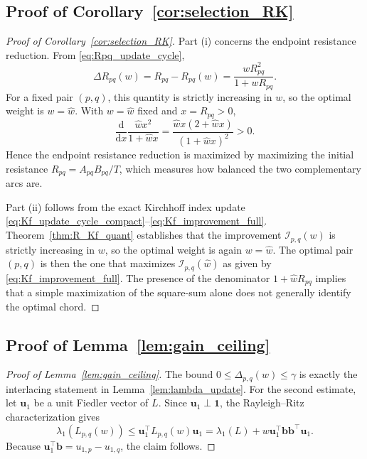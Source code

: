 \documentclass[11pt]{article}
\numberwithin{equation}{section}
\theoremstyle{definition}
\theoremstyle{remark}
\begin{document}
\subsection{Proof of Corollary~\ref{cor:selection_RK}}
\begin{proof}[Proof of Corollary~\ref{cor:selection_RK}]
	Part (i) concerns the endpoint resistance reduction. From \eqref{eq:Rpq_update_cycle},
	\[
	\Delta R_{pq}(w)=R_{pq}-R_{pq}(w)=\frac{wR_{pq}^2}{1+wR_{pq}}.
	\]
	For a fixed pair $(p,q)$, this quantity is strictly increasing in $w$, so the optimal weight is $w=\hat{w}$. With $w=\hat{w}$ fixed and $x=R_{pq}>0$,
	\[
	\frac{\mathrm d}{\mathrm dx}\frac{\hat{w}x^2}{1+\hat{w}x}
	=\frac{\hat{w}x(2+\hat{w}x)}{(1+\hat{w}x)^2}>0.
	\]
	Hence the endpoint resistance reduction is maximized by maximizing the initial resistance $R_{pq}=A_{pq}B_{pq}/T$, which measures how balanced the two complementary arcs are.
	
	Part (ii) follows from the exact Kirchhoff index update \eqref{eq:Kf_update_cycle_compact}--\eqref{eq:Kf_improvement_full}. Theorem~\ref{thm:R_Kf_quant} establishes that the improvement $\mathcal{I}_{p,q}(w)$ is strictly increasing in $w$, so the optimal weight is again $w=\hat{w}$. The optimal pair $(p,q)$ is then the one that maximizes $\mathcal{I}_{p,q}(\hat{w})$ as given by \eqref{eq:Kf_improvement_full}. The presence of the denominator $1+\hat{w} R_{pq}$ implies that a simple maximization of the square-sum alone does not generally identify the optimal chord.
\end{proof}

\subsection{Proof of Lemma~\ref{lem:gain_ceiling}}
\begin{proof}[Proof of Lemma~\ref{lem:gain_ceiling}]
	The bound $0\le \Delta_{p,q}(w)\le \gamma$ is exactly the interlacing
	statement in Lemma~\ref{lem:lambda_update}. For the second estimate,
	let $\boldsymbol{u}_1$ be a unit Fiedler vector of $L$. Since
	$\boldsymbol{u}_1\perp \boldsymbol{1}$, the Rayleigh--Ritz
	characterization gives
	\[
	\lambda_1(L_{p,q}(w))
	\le
	\boldsymbol{u}_1^\top L_{p,q}(w)\boldsymbol{u}_1
	=
	\lambda_1(L)+w\boldsymbol{u}_1^\top
	\boldsymbol{b}\boldsymbol{b}^\top\boldsymbol{u}_1.
	\]
	Because $\boldsymbol{u}_1^\top\boldsymbol{b}=u_{1,p}-u_{1,q}$, the
	claim follows.
\end{proof}
\end{document}

